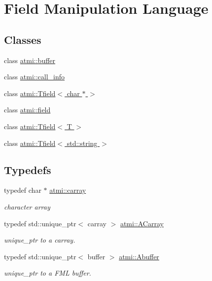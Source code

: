 \hypertarget{group__fml}{\section{Field Manipulation Language}
\label{group__fml}
}
\subsection*{Classes}
\begin{DoxyCompactItemize}
\item 
class \hyperlink{classatmi_1_1buffer}{atmi\+::buffer}
\item 
class \hyperlink{classatmi_1_1call__info}{atmi\+::call\+\_\+info}
\item 
class \hyperlink{classatmi_1_1_tfield_3_01char_01_5_01_4}{atmi\+::\+Tfield$<$ char $\ast$ $>$}
\item 
class \hyperlink{classatmi_1_1field}{atmi\+::field}
\item 
class \hyperlink{classatmi_1_1_tfield}{atmi\+::\+Tfield$<$ T $>$}
\item 
class \hyperlink{classatmi_1_1_tfield_3_01std_1_1string_01_4}{atmi\+::\+Tfield$<$ std\+::string $>$}
\end{DoxyCompactItemize}
\subsection*{Typedefs}
\begin{DoxyCompactItemize}
\item 
\hypertarget{group__fml_ga8b57f9a4e2453d8e5d82ac0016e35e87}{typedef char $\ast$ \hyperlink{group__fml_ga8b57f9a4e2453d8e5d82ac0016e35e87}{atmi\+::carray}}\label{group__fml_ga8b57f9a4e2453d8e5d82ac0016e35e87}

\begin{DoxyCompactList}\small\item\em character array \end{DoxyCompactList}\item 
\hypertarget{group__fml_ga095330dfead97321f0830e3fa204a24a}{typedef std\+::unique\+\_\+ptr$<$ carray $>$ \hyperlink{group__fml_ga095330dfead97321f0830e3fa204a24a}{atmi\+::\+A\+Carray}}\label{group__fml_ga095330dfead97321f0830e3fa204a24a}

\begin{DoxyCompactList}\small\item\em unique\+\_\+ptr to a carray. \end{DoxyCompactList}\item 
\hypertarget{group__fml_gaa6276ba0b9cf18dd00fae53b1ce132f4}{typedef std\+::unique\+\_\+ptr$<$ buffer $>$ \hyperlink{group__fml_gaa6276ba0b9cf18dd00fae53b1ce132f4}{atmi\+::\+Abuffer}}\label{group__fml_gaa6276ba0b9cf18dd00fae53b1ce132f4}

\begin{DoxyCompactList}\small\item\em unique\+\_\+ptr to a F\+M\+L buffer. \end{DoxyCompactList}\end{DoxyCompactItemize}
